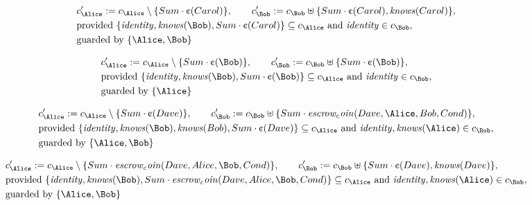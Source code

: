 \begin{align*}
&
c'_
{
\Alice
}
 := 
c_
{
\Alice
}
 \setminus 
\{
Sum
\cdot
\text{\textcent}
(
Carol
)
\}
, \qquad 
c'_
{
\Bob
}
 := 
c_
{
\Bob
}
 \uplus 
\{
Sum
\cdot
\text{\textcent}
(
Carol
)
,
\mathit{
knows
}
(
Carol
)
\}
,\\
&
\text{provided } 
\{
\mathit{
identity
}
,
\mathit{
knows
}
(
\Bob
)
,
Sum
\cdot
\text{\textcent}
(
Carol
)
\}
 \subseteq c_
{
\Alice
}
 \text{ and } 
\mathit{
identity
}
 \in c_
{
\Bob
}
,\\
&
\text{guarded by } \{
\Alice
,
\Bob
\}
\end{align*}

\begin{align*}
&
c'_
{
\Alice
}
 := 
c_
{
\Alice
}
 \setminus 
\{
Sum
\cdot
\text{\textcent}
(
\Bob
)
\}
, \qquad 
c'_
{
\Bob
}
 := 
c_
{
\Bob
}
 \uplus 
\{
Sum
\cdot
\text{\textcent}
(
\Bob
)
\}
,\\
&
\text{provided } 
\{
\mathit{
identity
}
,
\mathit{
knows
}
(
\Bob
)
,
Sum
\cdot
\text{\textcent}
(
\Bob
)
\}
 \subseteq c_
{
\Alice
}
 \text{ and } 
\mathit{
identity
}
 \in c_
{
\Bob
}
,\\
&
\text{guarded by } \{
\Alice
\}
\end{align*}

\begin{align*}
&
c'_
{
\Alice
}
 := 
c_
{
\Alice
}
 \setminus 
\{
Sum
\cdot
\text{\textcent}
(
Dave
)
\}
, \qquad 
c'_
{
\Bob
}
 := 
c_
{
\Bob
}
 \uplus 
\{
Sum
\cdot
\mathit{
escrow_coin
}
(
Dave
,
\Alice
,
Bob
,
Cond
)
\}
,\\
&
\text{provided } 
\{
\mathit{
identity
}
,
\mathit{
knows
}
(
\Bob
)
,
\mathit{
knows
}
(
Bob
)
,
Sum
\cdot
\text{\textcent}
(
Dave
)
\}
 \subseteq c_
{
\Alice
}
 \text{ and } 
\mathit{
identity
}
,
\mathit{
knows
}
(
\Alice
)
 \in c_
{
\Bob
}
,\\
&
\text{guarded by } \{
\Alice
,
\Bob
\}
\end{align*}

\begin{align*}
&
c'_
{
\Alice
}
 := 
c_
{
\Alice
}
 \setminus 
\{
Sum
\cdot
\mathit{
escrow_coin
}
(
Dave
,
Alice
,
\Bob
,
Cond
)
\}
, \qquad 
c'_
{
\Bob
}
 := 
c_
{
\Bob
}
 \uplus 
\{
Sum
\cdot
\text{\textcent}
(
Dave
)
,
\mathit{
knows
}
(
Dave
)
\}
,\\
&
\text{provided } 
\{
\mathit{
identity
}
,
\mathit{
knows
}
(
\Bob
)
,
Sum
\cdot
\mathit{
escrow_coin
}
(
Dave
,
Alice
,
\Bob
,
Cond
)
\}
 \subseteq c_
{
\Alice
}
 \text{ and } 
\mathit{
identity
}
,
\mathit{
knows
}
(
\Alice
)
 \in c_
{
\Bob
}
,\\
&
\text{guarded by } \{
\Alice
,
\Bob
\}
\end{align*}
